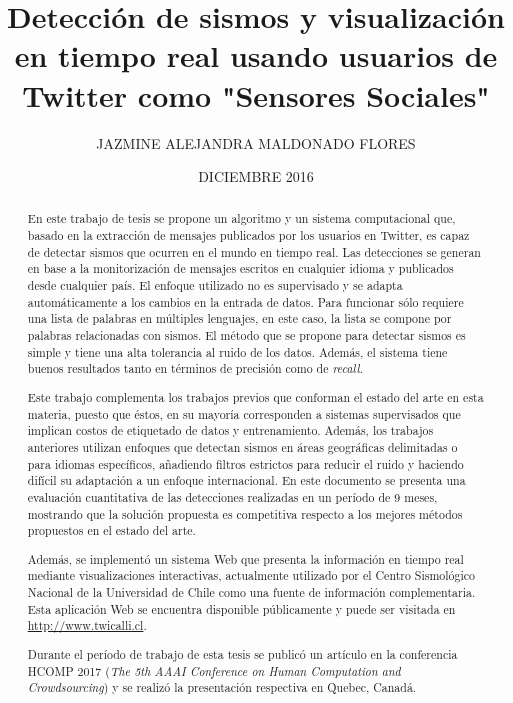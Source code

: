 \documentclass[upright, contnum]{umemoria}
\author{JAZMINE ALEJANDRA MALDONADO FLORES}
\title{Detección de sismos y visualización en tiempo real usando usuarios de Twitter como "Sensores Sociales"}
\date{DICIEMBRE 2016}
\begin{document}
\frontmatter
\maketitle

\begin{abstract}
En este trabajo de tesis se propone un algoritmo y un sistema computacional que, basado en la extracción de mensajes publicados por los usuarios en Twitter, es capaz de detectar sismos que ocurren en el mundo en tiempo real. Las detecciones se generan en base a la monitorización de mensajes escritos en cualquier idioma y publicados desde cualquier país. El enfoque utilizado no es supervisado y se adapta automáticamente a los cambios en la entrada de datos. Para funcionar sólo requiere una lista de palabras en múltiples lenguajes, en este caso, la lista se compone por palabras relacionadas con sismos. 
El método que se propone para detectar sismos es simple y tiene una alta tolerancia al ruido de los datos.  Además, el sistema tiene buenos resultados tanto en términos de precisión como de \textit{recall.} 

Este trabajo complementa los trabajos previos que conforman el estado del arte en esta materia, puesto que éstos, en su mayoría corresponden a sistemas supervisados que implican costos de etiquetado de datos y entrenamiento. Además, los trabajos anteriores utilizan enfoques que detectan sismos en áreas geográficas delimitadas o para idiomas específicos, añadiendo filtros estrictos para reducir el ruido y haciendo difícil su adaptación a un enfoque internacional. En este documento se presenta una evaluación cuantitativa de las detecciones realizadas en un período de 9 meses, mostrando que la solución propuesta es competitiva respecto a los mejores métodos propuestos en el estado del arte. 

Además, se implementó un sistema Web que presenta la información en tiempo real mediante visualizaciones interactivas, actualmente utilizado por el Centro Sismológico Nacional de la Universidad de Chile como una fuente de información complementaria. Esta aplicación Web se encuentra disponible públicamente y puede ser visitada en \url{http://www.twicalli.cl}.

Durante el período de trabajo de esta tesis se publicó un artículo en la conferencia HCOMP 2017 (\textit{The 5th AAAI Conference on Human Computation and Crowdsourcing}) y se realizó la presentación respectiva en Quebec, Canadá.  

\end{abstract}
\end{document}
